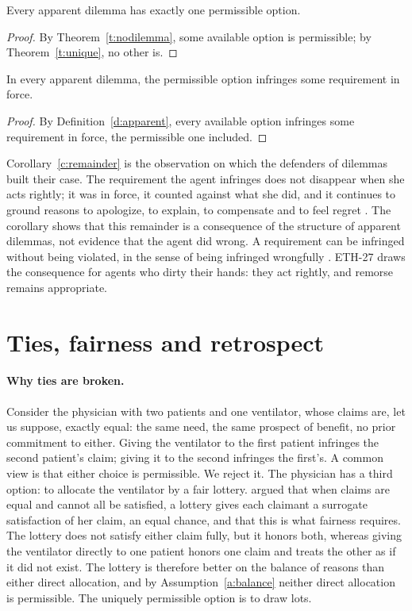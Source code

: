 \documentclass{situationist-preprint}
\begin{document}
\begin{theorem}\label{t:main}
Every apparent dilemma has exactly one permissible option.
\end{theorem}

\begin{proof}
By Theorem~\ref{t:nodilemma}, some available option is permissible; by Theorem~\ref{t:unique}, no other is.
\end{proof}

\begin{corollary}[Remainder]\label{c:remainder}
In every apparent dilemma, the permissible option infringes some requirement in force.
\end{corollary}

\begin{proof}
By Definition~\ref{d:apparent}, every available option infringes some requirement in force, the permissible one included.
\end{proof}

Corollary~\ref{c:remainder} is the observation on which the defenders of dilemmas built their case. The requirement the agent infringes does not disappear when she acts rightly; it was in force, it counted against what she did, and it continues to ground reasons to apologize, to explain, to compensate and to feel regret \citep{Williams1965,Marcus1980}. The corollary shows that this remainder is a consequence of the structure of apparent dilemmas, not evidence that the agent did wrong. A requirement can be infringed without being violated, in the sense of being infringed wrongfully \citep[ch.~3]{Thomson1990}. ETH-27 draws the consequence for agents who dirty their hands: they act rightly, and remorse remains appropriate.

\section{Ties, fairness and retrospect}\label{s:ties}

\paragraph{Why ties are broken.} Consider the physician with two patients and one ventilator, whose claims are, let us suppose, exactly equal: the same need, the same prospect of benefit, no prior commitment to either. Giving the ventilator to the first patient infringes the second patient's claim; giving it to the second infringes the first's. A common view is that either choice is permissible. We reject it. The physician has a third option: to allocate the ventilator by a fair lottery. \citet{Broome1990} argued that when claims are equal and cannot all be satisfied, a lottery gives each claimant a surrogate satisfaction of her claim, an equal chance, and that this is what fairness requires. The lottery does not satisfy either claim fully, but it honors both, whereas giving the ventilator directly to one patient honors one claim and treats the other as if it did not exist. The lottery is therefore better on the balance of reasons than either direct allocation, and by Assumption~\ref{a:balance} neither direct allocation is permissible. The uniquely permissible option is to draw lots.
\end{document}
